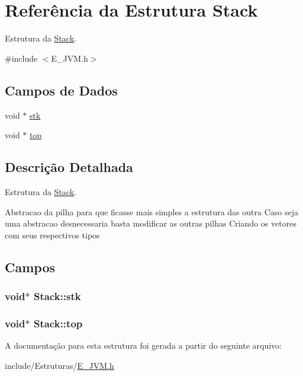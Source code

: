 \hypertarget{struct_stack}{}\section{Referência da Estrutura Stack}
\label{struct_stack}


Estrutura da \hyperlink{struct_stack}{Stack}.  




{\ttfamily \#include $<$E\+\_\+\+J\+V\+M.\+h$>$}

\subsection*{Campos de Dados}
\begin{DoxyCompactItemize}
\item 
void $\ast$ \hyperlink{struct_stack_af2d2e9e2e533f72d25eb18831324dc6b}{stk}
\item 
void $\ast$ \hyperlink{struct_stack_a53d77bffd22d0fa488c483a8f86be67c}{top}
\end{DoxyCompactItemize}


\subsection{Descrição Detalhada}
Estrutura da \hyperlink{struct_stack}{Stack}. 

Abstracao da pilha para que ficasse mais simples a estrutura das outra Caso seja uma abstracao desnecessaria basta modificar as outras pilhas Criando os vetores com seus respectivos tipos 

\subsection{Campos}
\hypertarget{struct_stack_af2d2e9e2e533f72d25eb18831324dc6b}{}
\subsubsection[{stk}]{\setlength{\rightskip}{0pt plus 5cm}void$\ast$ Stack\+::stk}\label{struct_stack_af2d2e9e2e533f72d25eb18831324dc6b}
\hypertarget{struct_stack_a53d77bffd22d0fa488c483a8f86be67c}{}
\subsubsection[{top}]{\setlength{\rightskip}{0pt plus 5cm}void$\ast$ Stack\+::top}\label{struct_stack_a53d77bffd22d0fa488c483a8f86be67c}


A documentação para esta estrutura foi gerada a partir do seguinte arquivo\+:\begin{DoxyCompactItemize}
\item 
include/\+Estruturas/\hyperlink{_e___j_v_m_8h}{E\+\_\+\+J\+V\+M.\+h}\end{DoxyCompactItemize}
